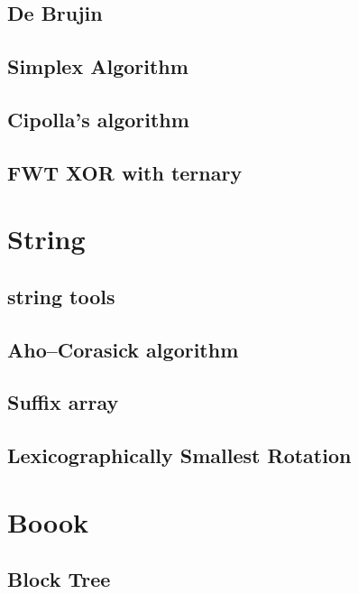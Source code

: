 \documentclass[a4paper,10pt,twocolumn,oneside]{article}
\begin{document}
\subsection{De Brujin}


\subsection{Simplex Algorithm}


\subsection{Cipolla's algorithm}


\subsection{FWT XOR with ternary}


\section{String}
\subsection{string tools}


\subsection{Aho–Corasick algorithm}


\subsection{Suffix array}


\subsection{Lexicographically Smallest Rotation}

\section{Boook}

\subsection{Block Tree}

\end{document}
